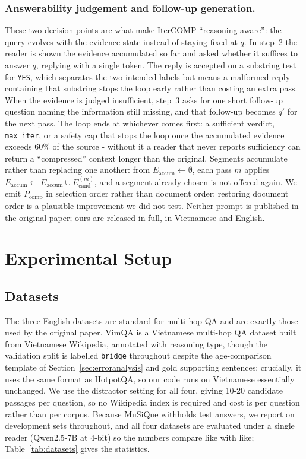 \documentclass{llncs}
\begin{document}
\subsubsection{Answerability judgement and follow-up generation.}
These two decision points are what make IterCOMP
``reasoning-aware'': the query evolves with the evidence state instead of
staying fixed at $q$. In step~2 the reader is shown the evidence accumulated so
far and asked whether it suffices to answer $q$, replying with a single token.
The reply is accepted on a substring test for \texttt{YES}, which separates the
two intended labels but means a malformed reply containing that substring stops
the loop early rather than costing an extra pass. When the evidence is judged insufficient, step~3 asks for one short
follow-up question naming the information still missing, and that follow-up
becomes $q'$ for the next pass. The loop ends at whichever comes first: a
sufficient verdict, \texttt{max\_iter}, or a safety cap that stops the loop once
the accumulated evidence exceeds $60\%$ of the source - without it a reader that
never reports sufficiency can return a ``compressed'' context longer than the
original. Segments accumulate rather than replacing one another: from
$E_{\text{accum}} \leftarrow \emptyset$, each pass $m$ applies
$E_{\text{accum}} \leftarrow E_{\text{accum}} \cup E_{\text{cand}}^{(m)}$, and a
segment already chosen is not offered again. We emit $P_{\text{comp}}$ in
selection order rather than document order; restoring document order is a
plausible improvement we did not test. Neither prompt is published in the original
paper; ours are released in full, in Vietnamese and English.

\section{Experimental Setup}
\label{sec:setup}

\subsection{Datasets}
\label{sec:dataset}

The three English datasets are standard for multi-hop QA and are exactly those
used by the original paper. VimQA \cite{le2022vimqa} is a Vietnamese
multi-hop QA dataset built from Vietnamese Wikipedia, annotated with reasoning type, though the validation
split is labelled \texttt{bridge} throughout despite the age-comparison template
of Section~\ref{sec:erroranalysis} and gold supporting sentences; crucially,
it uses the same format as HotpotQA, so our code runs on Vietnamese
essentially unchanged. We use the distractor setting for all four, giving
10-20 candidate passages per question, so no Wikipedia index is required
and cost is per question rather than per corpus. Because MuSiQue
withholds test answers, we report on development sets throughout, and all four
datasets are evaluated under a single reader (Qwen2.5-7B at 4-bit) so the numbers
compare like with like; Table~\ref{tab:datasets} gives the statistics.
\end{document}
